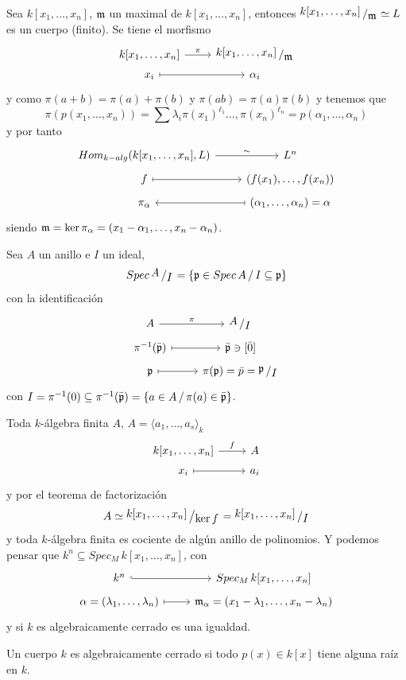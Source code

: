     \begin{ejem}
        Sea $k[x_1, \ldots, x_n]$, $\mathfrak{m}$ un maximal de $k[x_1, \ldots, x_n]$, entonces $\modulo{k[x_1, \ldots, x_n]}{\m} \simeq L$ es un cuerpo (finito). Se tiene el morfismo 
        $$\bt k[x_1, \ldots, x_n] \rar{\pi} & \modulo{k[x_1, \ldots, x_n]}{\m} \\[-5mm] x_i \rarmaps & \alpha_i  \et$$
        y como $\pi(a+b) = \pi(a) + \pi(b)$ y $\pi(ab) = \pi(a) \pi(b)$ y tenemos que 
        $$\pi(p(x_1, \ldots, x_n)) = \sum \lambda_i \pi(x_1)^{\ell_1} \ldots, \pi(x_n)^{\ell_n} = p(\alpha_1, \ldots, \alpha_n)$$
        y por tanto
        $$\bt Hom_{k-alg} (k[x_1, \ldots, x_n], L) \rar{\sim} & L^n \\[-5mm] f \rarmaps & (f(x_1), \ldots, f(x_n)) \\[-5mm] \pi_{\alpha} & \arrow[mapsto]{l} (\alpha_1, \ldots, \alpha_n) = \alpha \et$$
        siendo $\mathfrak{m} = \ker \pi_{\alpha} = (x_1-\alpha_1, \ldots, x_n-\alpha_n)$.
    \end{ejem}
    \begin{obs}
        Sea $A$ un anillo e $I$ un ideal, 
        $$Spec\, \modulo{A}{I} = \{\p \in Spec\, A \, / \, I \subseteq \p   \}$$ con la identificaci\'on
        $$\bt A \rar{\pi} & \modulo{A}{I} \\[-5mm] \pi^{-1}(\bar \p) \rarmaps & \bar \p \ni[\bar 0] \\[-5mm] \p \rarmaps & \pi(\p) = \bar p = \modulo{\p}{I} \et$$
        con $I = \pi^{-1}(0)\subseteq  \pi^{-1}(\bar {\mathfrak{p}})  = \{a\in A \, / \, \pi(a) \in \bar {\mathfrak{p}}\}$. 

        Toda $k$-\'algebra finita $A$, $A = \langle a_1, \ldots, a_s \rangle_k$ 
        $$\bt k[x_1, \ldots, x_n] \rar{f} & A \\[-5mm] x_i \rarmaps & a_i \et$$
        y por el teorema de factorizaci\'on
        $$A \simeq \modulo{k[x_1, \ldots, x_n] }{\ker f} = \modulo{k[x_1, \ldots, x_n] }{I}$$
        y toda $k$-\'algebra finita es cociente de alg\'un anillo de polinomios. Y podemos pensar que $k^n \subseteq Spec_M \, k[x_1, \ldots, x_n]$, con 
        $$\bt k^n \arrow[hook]{r} & Spec_M \, k[x_1, \ldots, x_n] \\[-5mm] \alpha= (\lambda_1, \ldots, \lambda_n) \rarmaps & \m_{\alpha} = (x_1-\lambda_1, \ldots, x_n - \lambda_n) \et$$
        y si $k$ es algebraicamente cerrado es una igualdad.
    \end{obs}
    \begin{defi}
        Un cuerpo $k$ es algebraicamente cerrado si todo $p(x) \in k[x]$ tiene alguna ra\'iz en $k$.
    \end{defi}
